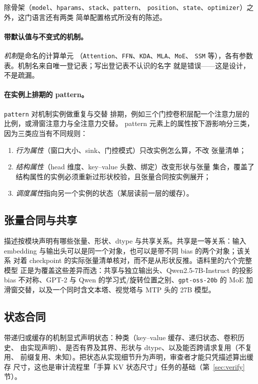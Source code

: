 \documentclass[11pt,a4paper]{ctexart}
\newcommand{\code}[1]{\texttt{#1}}
\begin{document}
除骨架（\code{model}、\code{hparams}、\code{stack}、\code{pattern}、
\code{position}、\code{state}、\code{optimizer}）之外，这门语言还有两类
简单配置格式所没有的陈述。

\paragraph{带默认值与不变式的机制。}\emph{机制}是命名的计算单元
（\code{Attention}、\code{FFN}、\code{KDA}、\code{MLA}、\code{MoE}、
\code{SSM} 等），各有参数表。机制名来自唯一登记表；写出登记表不认识的名字
就是错误——这是设计，不是疏漏。

\paragraph{在实例上排期的 pattern。}\code{pattern} 对机制实例做重复与交替
排期，例如三个门控卷积层配一个注意力层的比例，或滑窗注意力与全注意力交替。
pattern 元素上的属性按下游影响分三类，因为三类应当有不同规则：
\begin{enumerate}
  \item \emph{行为属性}（窗口大小、sink、门控模式）只改实例怎么算，不改
  张量清单；
  \item \emph{结构属性}（head 维度、key--value 头数、绑定）改变形状与张量
  集合，覆盖了结构属性的实例必须重新过形状校验，且张量合同按实例展开；
  \item \emph{调度属性}指向另一个实例的状态（某层读前一层的缓存）。
\end{enumerate}

\subsection{张量合同与共享}

描述按模块声明有哪些张量、形状、dtype 与共享关系。共享是一等关系：输入
embedding 与输出头可以是同一个对象，也可以是带不同 bias 的两个对象；该关系
对着 checkpoint 的实际张量清单核对，而不是从形状反推。语料里的六个完整模型
正是为覆盖这些差异而选：共享与独立输出头、Qwen2.5-7B-Instruct 的投影 bias
不对称、GPT-2 与 Qwen 的学习式/旋转位置之别、\code{gpt-oss-20b} 的 MoE 加
滑窗交替，以及一个同时含文本塔、视觉塔与 MTP 头的 27B 模型。

\subsection{状态合同}

带递归或缓存的机制显式声明状态：种类（key--value 缓存、递归状态、卷积历史、
由实现声明）、是否有界及其界、形状与 dtype、以及能否跨请求复用（不复用、
前缀复用、未知）。把状态从实现细节升为声明，审查者才能只凭描述算出缓存
尺寸，这也是审计流程里「手算 KV 状态尺寸」任务的基础（第~\ref{sec:verify} 节）。
\end{document}
